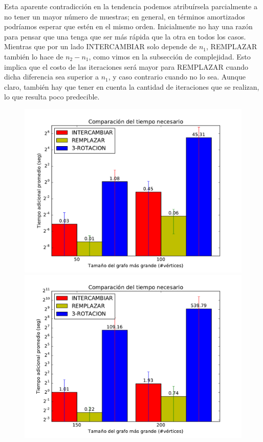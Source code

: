 Esta aparente contradicción en la tendencia podemos atribuírsela parcialmente a no tener un mayor número de muestras; en general, en términos amortizados podríamos esperar que estén en el mismo orden. Inicialmente no hay una razón para pensar que una tenga que ser más rápida que la otra en todos los casos. Mientras que por un lado INTERCAMBIAR solo depende de $n_1$, REMPLAZAR también lo hace de $n_2-n_1$, como vimos en la subsección de complejidad. Esto implica que el costo de las iteraciones será mayor para REMPLAZAR cuando dicha diferencia sea superior a $n_1$, y caso contrario cuando no lo sea. Aunque claro, también hay que tener en cuenta la cantidad de iteraciones que se realizan, lo que resulta poco predecible.  

\begin{figure}[H]
\centering
\begin{minipage}{0.49\textwidth}
  \centering
    \includegraphics[width=1\textwidth]{graficos/problema_5/tiempo0.pdf}
  \caption{}
  \label{fig:tiempo1}
\end{minipage}%
\hspace{0.01\textwidth}
\begin{minipage}{0.49\textwidth}   
  \centering
    \includegraphics[width=1\textwidth]{graficos/problema_5/tiempo2.pdf} 
  \caption{}
  \label{fig:tiempo2}
\end{minipage}


\end{figure}
